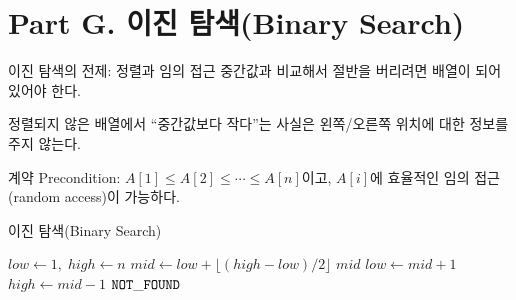 \section{Part G. 이진 탐색(Binary Search)}

\begin{frame}{이진 탐색의 전제: 정렬과 임의 접근}
  중간값과 비교해서 절반을 버리려면 배열이 되어 있어야 한다.
  \begin{center}
  \end{center}
  정렬되지 않은 배열에서 ``중간값보다 작다''는 사실은 왼쪽/오른쪽 위치에 대한 정보를 주지 않는다.
  \begin{alertblock}{계약}
    Precondition: $A[1]\le A[2]\le\cdots\le A[n]$이고,
    $A[i]$에 효율적인 임의 접근(random access)이 가능하다.
  \end{alertblock}
\end{frame}

\begin{frame}[fragile]{이진 탐색(Binary Search)}
  \begin{algorithmic}[1]
      \State $low\gets1,\; high\gets n$
        \State $mid\gets low+\lfloor(high-low)/2\rfloor$
         \State \Return $mid$
         \State $low\gets mid+1$
        \Else \State $high\gets mid-1$
        \EndIf
      \EndWhile
      \State \Return $\mathtt{NOT\_FOUND}$
    \EndProcedure
  \end{algorithmic}
\end{frame}

